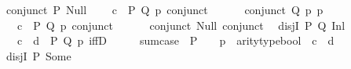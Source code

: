\begin{isabellebody}
\isanewline
\ \ conjunct{}\ {\isacharparenleft}{\kern0pt}P{\isacharparenright}{\kern0pt}{\isacharcolon}{\kern0pt}\ {\isachardoublequoteopen}Null{\isachardoublequoteclose}\isanewline
\ \ \ \ {\isachardoublequoteopen}\isactrlbold {\isasymlambda}{\isacharparenleft}{\kern0pt}c{\isacharcolon}{\kern0pt}\ {\isacharunderscore}{\kern0pt}{\isacharparenright}{\kern0pt}\ P\ Q\ p{\isachardot}{\kern0pt}\ conjunct{}\ {\isasymcdot}\ {\isacharunderscore}{\kern0pt}\ {\isasymcdot}\ {\isacharunderscore}{\kern0pt}{\isachardoublequoteclose}\isanewline
\isanewline
\ \ conjunct{}\ {\isacharparenleft}{\kern0pt}Q{\isacharparenright}{\kern0pt}{\isacharcolon}{\kern0pt}\ {\isachardoublequoteopen}{\isasymlambda}p{\isachardot}{\kern0pt}\ p{\isachardoublequoteclose}\isanewline
\ \ \ \ {\isachardoublequoteopen}\isactrlbold {\isasymlambda}{\isacharparenleft}{\kern0pt}c{\isacharcolon}{\kern0pt}\ {\isacharunderscore}{\kern0pt}{\isacharparenright}{\kern0pt}\ P\ Q\ p{\isachardot}{\kern0pt}\ conjunct{}\ {\isasymcdot}\ {\isacharunderscore}{\kern0pt}\ {\isasymcdot}\ {\isacharunderscore}{\kern0pt}{\isachardoublequoteclose}\isanewline
\isanewline
\ \ conjunct{}{\isacharcolon}{\kern0pt}\ {\isachardoublequoteopen}Null{\isachardoublequoteclose}\ {\isachardoublequoteopen}conjunct{}{\isachardoublequoteclose}\isanewline
\isanewline
\ \ disjI{}\ {\isacharparenleft}{\kern0pt}P{\isacharcomma}{\kern0pt}\ Q{\isacharparenright}{\kern0pt}{\isacharcolon}{\kern0pt}\ {\isachardoublequoteopen}Inl{\isachardoublequoteclose}\isanewline
\ \ \ \ {\isachardoublequoteopen}\isactrlbold {\isasymlambda}{\isacharparenleft}{\kern0pt}c{\isacharcolon}{\kern0pt}\ {\isacharunderscore}{\kern0pt}{\isacharparenright}{\kern0pt}\ {\isacharparenleft}{\kern0pt}d{\isacharcolon}{\kern0pt}\ {\isacharunderscore}{\kern0pt}{\isacharparenright}{\kern0pt}\ P\ Q\ p{\isachardot}{\kern0pt}\ iffD{}\ {\isasymcdot}\ {\isacharunderscore}{\kern0pt}\ {\isasymcdot}\ {\isacharunderscore}{\kern0pt}\ {\isasymbullet}\ {\isacharparenleft}{\kern0pt}sum{\isachardot}{\kern0pt}case{\isacharunderscore}{\kern0pt}{}\ {\isasymcdot}\ P\ {\isasymcdot}\ {\isacharunderscore}{\kern0pt}\ {\isasymcdot}\ p\ {\isasymbullet}\ arity{\isacharunderscore}{\kern0pt}type{\isacharunderscore}{\kern0pt}bool\ {\isasymbullet}\ c\ {\isasymbullet}\ d{\isacharparenright}{\kern0pt}{\isachardoublequoteclose}\isanewline
\isanewline
\ \ disjI{}\ {\isacharparenleft}{\kern0pt}P{\isacharparenright}{\kern0pt}{\isacharcolon}{\kern0pt}\ {\isachardoublequoteopen}Some{\isachardoublequoteclose}\isanewline

\end{isabellebody}
